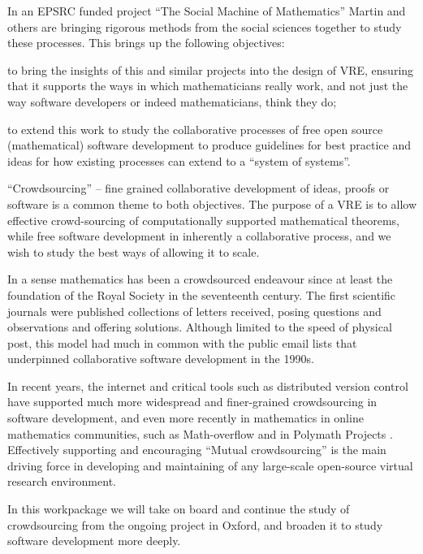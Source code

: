 \begin{workpackage}[id=social-aspects,wphases=0-48,
  title=Social Aspects,
  lead=UO,
  UORM=27,USHRM=8, USORM=6]
\begin{wpobjectives}
In an EPSRC funded project ``The Social Machine of Mathematics''
Martin and others are bringing rigorous methods from the social 
sciences together to study these processes. This brings up the following
objectives: 
\begin{compactitem}
\item to bring the insights of this and similar projects into the
  design of \TheProject VRE, ensuring that it supports the ways in
  which mathematicians really work, and not just the way software
  developers or indeed mathematicians, think they do;
\item to extend this work to study the collaborative processes of free
  open source (mathematical) software development to produce
  guidelines for best practice and ideas for how existing processes
  can extend to a ``system of systems''.
\end{compactitem} 
\end{wpobjectives}

\begin{wpdescription}


``Crowdsourcing'' -- fine grained collaborative development of ideas,
  proofs or software is a common theme to both objectives. The purpose
  of a VRE is to allow effective crowd-sourcing of computationally
  supported mathematical theorems, while free software development in
  inherently a collaborative process, and we wish to study the best
  ways of allowing it to scale.

In a sense mathematics has been a crowdsourced endeavour since at
least the foundation of the Royal Society in the seventeenth century. 
The first scientific journals were published collections of letters
received, posing questions and observations and offering solutions. 
Although limited to the speed of physical post, this model had much in
common with the public email lists that underpinned collaborative
software development in the 1990s.

In recent years, the internet and critical tools such as distributed
version control have supported much more widespread and finer-grained
crowdsourcing in software development, and even more recently in
mathematics in online mathematics communities, such as Math-overflow
\cite{mathoverflow} and in Polymath Projects \cite{polymath_SIAM,
  PolymathBlog}.  Effectively supporting and encouraging ``Mutual
crowdsourcing'' is the main driving force in developing and
maintaining of any large-scale open-source virtual research
environment.

In this workpackage we will take on board and continue the study of
crowdsourcing from the ongoing project in Oxford, and broaden it to
study software development more deeply.


\end{wpdescription}
\end{workpackage}
